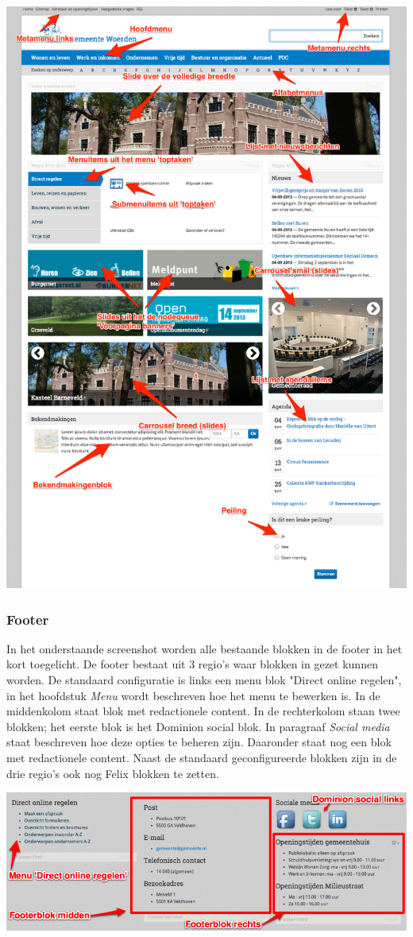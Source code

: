 \begin{center}
	\includegraphics[width=\textwidth]{img/voorpagina.png}
\end{center}

\subsubsection{Footer}

In het onderstaande screenshot worden alle bestaande blokken in de footer in het kort toegelicht. De footer bestaat uit 3 regio's waar blokken in gezet kunnen worden. De standaard configuratie is links een menu blok "Direct online regelen", in het hoofdstuk \emph{Menu} wordt beschreven hoe het menu te bewerken is. In de middenkolom staat blok met redactionele content. In de rechterkolom staan twee blokken; het eerste blok is het Dominion social blok. In paragraaf \emph{Social media} staat beschreven hoe deze opties te beheren zijn. Daaronder staat nog een blok met redactionele content. Naast de standaard geconfigureerde blokken zijn in de drie regio's ook nog Felix blokken te zetten. 

\bigskip

\begin{center}
	\includegraphics[width=\textwidth]{img/voorpagina3.png}
\end{center}